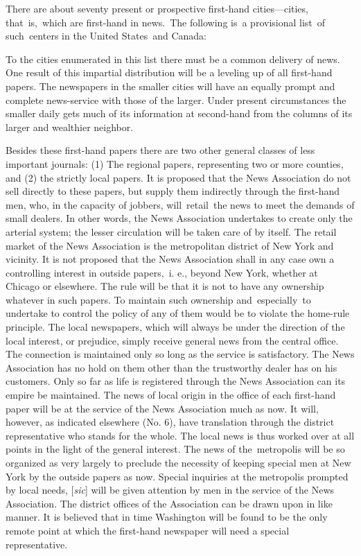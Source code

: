 \documentclass[openany,nobib]{tufte-book}
\begin{document}
There are about seventy present or prospective first-hand
cities---cities, that~is,~which are first-hand in news.~The following
is~a provisional list~of such~centers in the United States~and
Canada:~~~



To the cities enumerated in this list there must be a common delivery of
news. One result of this impartial distribution will be a leveling up of
all first-hand papers. The newspapers in the smaller cities will have an
equally prompt and complete news-service with those of the larger. Under
present circumstances the smaller daily gets much of its information at
second-hand from the columns of its larger and wealthier neighbor.~

Besides these first-hand papers there are two other general classes of
less important journals: (1) The regional papers, representing two or
more counties, and (2) the strictly local papers. It is proposed that
the News Association do not sell directly to these papers, but supply
them indirectly through the first-hand men, who, in the capacity of
jobbers, will~retail~the news to meet the demands of small dealers. In
other words, the News Association undertakes to create only the arterial
system; the lesser circulation will be taken care of by itself. The
retail market of the News Association is the metropolitan district of
New York and vicinity. It is not proposed that the News Association
shall in any case own a controlling interest in outside papers,~i. e.,
beyond New York, whether at Chicago or elsewhere. The rule will be that
it is not to have any ownership whatever in such papers. To maintain
such ownership and~especially~to undertake to control the policy of any
of them would be to violate the home-rule principle. The local
newspapers, which will always be under the direction of the local
interest, or prejudice, simply receive general news from the central
office. The connection is maintained only so long as the service is
satisfactory. The News Association has no hold on them other than the
trustworthy dealer has on his customers. Only so far as life is
registered through the News Association can its empire be maintained.
The news of local origin in the office of each first-hand paper will be
at the service of the News Association much as now. It will, however, as
indicated elsewhere (No. 6), have translation through the district
representative who stands for the whole. The local news is thus worked
over at all points in the light of the general interest. The news of
the~metropolis will be so organized as very largely to preclude the
necessity of keeping special men at New York by the outside papers as
now. Special inquiries at the metropolis prompted by local needs,
{[}\emph{sic}{]} will be given attention by men in the service of the
News Association. The district offices of the Association can be drawn
upon in like manner. It is believed that in time Washington will be
found to be the only remote point at which the first-hand newspaper will
need a special representative.~
\end{document}
